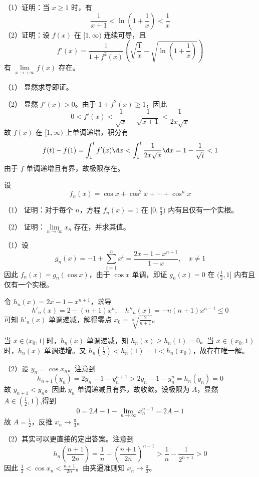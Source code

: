 \begin{problem}[000018]
（1）证明：当 $x \geqslant 1$ 时，有
\[ \frac{1}{x+1} < \ln\left(1 + \frac{1}{x}\right) < \frac{1}{x} \]
（2）证明：设 $f(x)$ 在 $[1, \infty)$ 连续可导，且
\[ f'(x) = \frac{1}{1 + f^2(x)} \left( \sqrt{\frac{1}{x}} - \sqrt{\ln\left(1 + \frac{1}{x}\right)} \right) \]
有 $\lim\limits_{x \to +\infty} f(x)$ 存在。
\end{problem}

\begin{solution}
	（1） 显然求导即证。

	（2） 显然 $f'(x) > 0$。由于 $1 + f^2(x) \geqslant 1$，因此
	\[ 0 < f'(x) < \frac{1}{\sqrt{x}} - \frac{1}{\sqrt{x+1}} < \frac{1}{2 x \sqrt{x}} \]
	故 $f(x)$ 在 $[1, \infty)$ 上单调递增，积分有
	\[ f(t) - f(1) = \int_{1}^{t} f'(x) \d x < \int_{1}^{t} \frac{1}{2 x \sqrt{x}} \d x = 1 - \frac{1}{\sqrt{t}} < 1 \]
	由于 $f$ 单调递增且有界，故极限存在。
\end{solution}

\begin{problem}[000020]
设
\[ f_n(x) = \cos x + \cos^2 x + \cdots + \cos^n x \]

（1） 证明：对于每个 $n$，方程 $f_n(x) = 1$ 在 $[0, \frac{\pi}{3})$ 内有且仅有一个实根。

（2） 证明：$\lim\limits_{n \to \infty} x_n$ 存在，并求其值。
\end{problem}

\begin{solution}
	（1）设
	\[ g_n(x) =  - 1 + \sum_{i=1}^n x^i = \frac{2x - 1 - x^{n+1}}{1 - x}, \quad x \neq 1 \]
	因此 $f_n(x) = g_n(\cos x)$，由于 $\cos x$ 单调，即证 $g_n(x) = 0$ 在 $(\frac{1}{2}, 1]$ 内有且仅有一个实根。


	令 $h_n(x) = 2x - 1 - x^{n+1}$，求导
	\[ h'_n(x) = 2 - (n + 1)x^n, \quad h''_n(x) = - n(n+1) x^{n-1} \leqslant 0 \]
	可知 $h'_n(x)$ 单调递减，解得零点 $x_0 = \sqrt[n]{\frac{2}{n + 1}}$。

	当 $x \in (x_0, 1]$ 时，$h_n(x)$ 单调递减，知 $h_n(x) \geqslant h_n(1) = 0$。当 $x \in (x_0, 1)$ 时，$h_n(x)$ 单调递增。又 $h_n(\frac{1}{2}) <  h_n(1) = 1 < h_n(x_0)$，故存在唯一解。

	（2）设 $y_n = \cos x_n$。注意到
	\[ h_{n+1}(y_n) = 2 y_n - 1 - y_{n}^{n+1} > 2 y_n - 1 - y_{n}^n = h_n(y_n) = 0 \]
	故 $y_{n+1} < y_{n}$。因此 $y_n$ 单调递减且有界，故收敛。设极限为 $A$，显然 $A \in (\frac{1}{2}, 1)$,得到
	\[ 0 = 2A - 1 - \lim_{n \to \infty} x_n^{n+1} = 2A - 1 \]
	故 $A = \frac{1}{2}$，反推 $x_n \to \frac{\pi}{3}$。

	（2）其实可以更直接的定出答案。注意到
	\[ h_n\left(\frac{n + 1}{2n}\right) = \frac{1}{n} - \left(\frac{n + 1}{2n}\right)^{n+1} > \frac{1}{n} - \frac{1}{2^{n+1}} > 0 \]
	因此 $\frac{1}{2} < \cos x_n < \frac{n + 1}{2n}$。由夹逼准则知 $x_n \to \frac{\pi}{3}$。

\end{solution}

